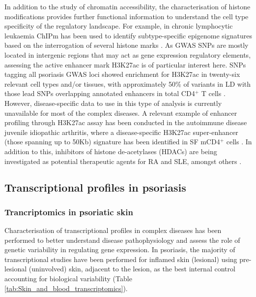 In addition to the study of chromatin accessibility, the characterisation of histone modifications provides further functional information to understand the cell type specificity of the regulatory landscape. For example, in chronic lymphocytic leukaemia ChIPm has been used to identify subtype-specific epigenome signatures based on the interrogation of several histone marks \parencite{Rendeiro2016}. As GWAS SNPs are mostly located in intergenic regions that may act as gene expression regulatory elements, assessing the active enhancer mark H3K27ac is of particular interest here. SNPs tagging all psoriasis GWAS loci showed enrichment for H3K27ac in twenty-six relevant cell types and/or tissues, with approximately 50\% of variants in LD with those lead SNPs overlapping annotated enhancers in total CD4$^+$ T cells \parencite{Lin2018}. However, disease-specific data to use in this type of analysis is currently unavailable for most of the complex diseases. A relevant example of enhancer profiling through H3K27ac assay has been conducted in the autoimmune disease juvenile idiopathic arthritis, where a disease-specific H3K27ac super-enhancer (those spanning up to 50Kb) signature has been identified in SF mCD4$^+$ cells \parencite{Peeters2015}. In addition to this, inhibitors of histone de-acetylases (HDACs) are being investigated as potential therapeutic agents for RA and SLE, amongst others \parencite{Hsieh2014,Shu2017}.




\subsection{Transcriptional profiles in psoriasis}

\subsubsection{Trancriptomics in psoriatic skin}
Characterisation of transcriptional profiles in complex diseases has been performed to better understand disease pathophysiology and assess the role of genetic variability in regulating gene expression. In psoriasis, the majority of transcriptional studies have been performed for inflamed skin (lesional) using pre-lesional (uninvolved) skin, adjacent to the lesion, as the best internal control accounting for biological variability (Table \ref{tab:Skin_and_blood_transcriptomics}). 

